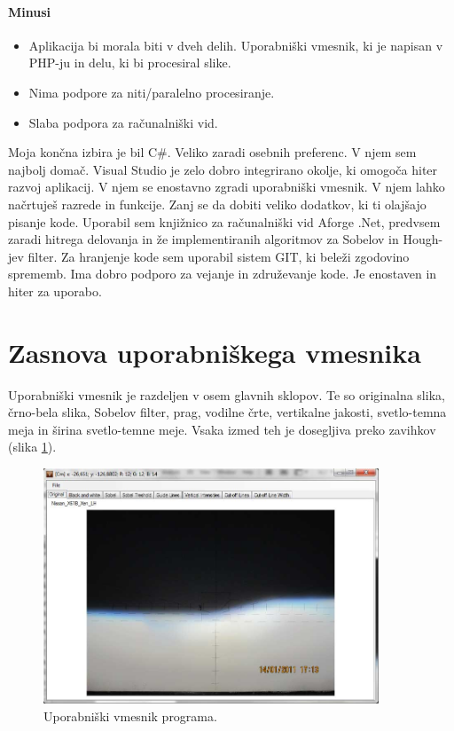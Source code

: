 \documentclass[oneside, a4paper, 12pt]{book}
\begin{document}
\paragraph{Minusi}
\begin{itemize}
\item Aplikacija bi morala biti v dveh delih. Uporabniški vmesnik, ki je napisan v PHP-ju in delu, ki bi procesiral slike.
\item Nima podpore za niti/paralelno procesiranje.
\item Slaba podpora za računalniški vid.
\end{itemize}

Moja končna izbira je bil C\#. Veliko zaradi osebnih preferenc. V njem sem najbolj domač. Visual Studio je zelo dobro integrirano okolje, ki omogoča hiter razvoj aplikacij. V njem se enostavno zgradi uporabniški vmesnik. V njem lahko načrtuješ razrede in funkcije. Zanj se da dobiti veliko dodatkov, ki ti olajšajo pisanje kode. 
Uporabil sem knjižnico za računalniški vid Aforge .Net, predvsem zaradi hitrega delovanja in že implementiranih algoritmov za Sobelov in Hough-jev filter.
Za hranjenje kode sem uporabil sistem GIT, ki beleži zgodovino sprememb. Ima dobro podporo za vejanje in združevanje kode. Je enostaven in hiter za uporabo.


\section{Zasnova uporabniškega vmesnika}
Uporabniški vmesnik je razdeljen v osem glavnih sklopov. Te so originalna slika, črno-bela slika, Sobelov filter, prag, vodilne črte, vertikalne jakosti, svetlo-temna meja in širina svetlo-temne meje. Vsaka izmed teh je dosegljiva preko zavihkov (slika \ref{pic:vmesnik1}).

\begin{figure}
\begin{center}
\includegraphics[width=10cm]{slike/vmesnik-glavni.jpg}
\end{center}
\caption{Uporabniški vmesnik programa.}
\label{pic:vmesnik1}
\end{figure}
\end{document}
